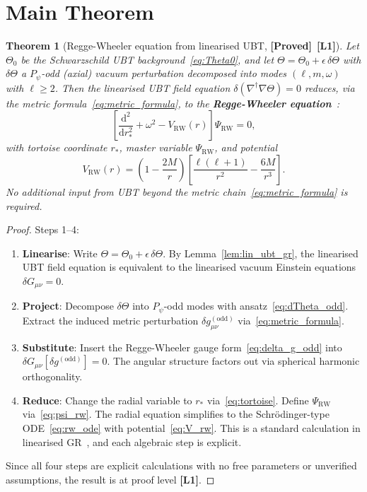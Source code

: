 \documentclass[12pt,a4paper]{article}
\newtheorem{theorem}{Theorem}[section]
\theoremstyle{definition}
\theoremstyle{remark}
\newcommand{\PROVED}{\textbf{[Proved]}}
\newcommand{\Lone}{\textbf{[L1]}}
\newcommand{\dd}{\mathrm{d}}
\begin{document}
\section{Main Theorem}
\label{sec:theorem}

\begin{resultbox}
\begin{theorem}[Regge-Wheeler equation from linearised UBT, \PROVED\ \Lone]
\label{thm:rw_linearised}
Let $\Theta_0$ be the Schwarzschild UBT background~\eqref{eq:Theta0}, and let
$\Theta = \Theta_0 + \epsilon\,\delta\Theta$ with $\delta\Theta$ a $P_\psi$-odd
(axial) vacuum perturbation decomposed into modes $(\ell,m,\omega)$ with $\ell\geq 2$.
Then the linearised UBT field equation $\delta(\nabla^\dagger\nabla\Theta) = 0$
reduces, via the metric formula~\eqref{eq:metric_formula}, to the
\textbf{Regge-Wheeler equation}~\cite{regge_wheeler1957}:
\[
  \left[\frac{\dd^2}{\dd r_*^2} + \omega^2
        - V_{\mathrm{RW}}(r)\right]\Psi_{\mathrm{RW}} = 0,
\]
with tortoise coordinate $r_*$, master variable $\Psi_{\mathrm{RW}}$, and
potential
\[
  V_{\mathrm{RW}}(r)
  = \left(1-\frac{2M}{r}\right)
    \left[\frac{\ell(\ell+1)}{r^2} - \frac{6M}{r^3}\right].
\]
No additional input from UBT beyond the metric chain~\eqref{eq:metric_formula}
is required.
\end{theorem}
\end{resultbox}

\begin{proof}
Steps 1--4:
\begin{enumerate}
\item \textbf{Linearise}: Write $\Theta = \Theta_0 + \epsilon\,\delta\Theta$.
  By Lemma~\ref{lem:lin_ubt_gr}, the linearised UBT field equation is
  equivalent to the linearised vacuum Einstein equations $\delta G_{\mu\nu} = 0$.

\item \textbf{Project}: Decompose $\delta\Theta$ into $P_\psi$-odd modes
  with ansatz~\eqref{eq:dTheta_odd}. Extract the induced metric perturbation
  $\delta g_{\mu\nu}^{(\mathrm{odd})}$ via~\eqref{eq:metric_formula}.

\item \textbf{Substitute}: Insert the Regge-Wheeler gauge form~\eqref{eq:delta_g_odd}
  into $\delta G_{\mu\nu}[\delta g^{(\mathrm{odd})}] = 0$.  The angular
  structure factors out via spherical harmonic orthogonality.

\item \textbf{Reduce}: Change the radial variable to $r_*$
  via~\eqref{eq:tortoise}. Define $\Psi_{\mathrm{RW}}$
  via~\eqref{eq:psi_rw}. The radial equation simplifies to the
  Schrödinger-type ODE~\eqref{eq:rw_ode} with
  potential~\eqref{eq:V_rw}. This is a standard calculation in linearised
  GR~\cite{regge_wheeler1957,chandrasekhar1983}, and each algebraic step is
  explicit.
\end{enumerate}
Since all four steps are explicit calculations with no free parameters or
unverified assumptions, the result is at proof level \Lone.
\end{proof}
\end{document}
